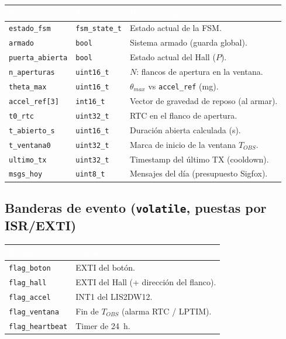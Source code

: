\documentclass[11pt,a4paper]{article}
\begin{document}
\begin{center}
\renewcommand{\arraystretch}{1.25}
\begin{tabularx}{\linewidth}{@{}l l X@{}}
\toprule
\rowcolor{Indigo0G}
\textcolor{white}{\textbf{Variable}} & \textcolor{white}{\textbf{Tipo}} & \textcolor{white}{\textbf{Descripción}} \\
\midrule
\texttt{estado\_fsm}   & \texttt{fsm\_state\_t} & Estado actual de la FSM. \\
\rowcolor{Light0G}
\texttt{armado}        & \texttt{bool}     & Sistema armado (guarda global). \\
\texttt{puerta\_abierta}& \texttt{bool}    & Estado actual del Hall ($P$). \\
\rowcolor{Light0G}
\texttt{n\_aperturas}  & \texttt{uint16\_t}& $N$: flancos de apertura en la ventana. \\
\texttt{theta\_max}    & \texttt{uint16\_t}& $\theta_{max}$ vs \texttt{accel\_ref} (mg). \\
\rowcolor{Light0G}
\texttt{accel\_ref[3]} & \texttt{int16\_t} & Vector de gravedad de reposo (al armar). \\
\texttt{t0\_rtc}       & \texttt{uint32\_t}& RTC en el flanco de apertura. \\
\rowcolor{Light0G}
\texttt{t\_abierto\_s} & \texttt{uint16\_t}& Duración abierta calculada (s). \\
\texttt{t\_ventana0}   & \texttt{uint32\_t}& Marca de inicio de la ventana $T_{OBS}$. \\
\rowcolor{Light0G}
\texttt{ultimo\_tx}    & \texttt{uint32\_t}& Timestamp del último TX (cooldown). \\
\texttt{msgs\_hoy}     & \texttt{uint8\_t} & Mensajes del día (presupuesto Sigfox). \\
\bottomrule
\end{tabularx}
\end{center}

\subsection{Banderas de evento (\texttt{volatile}, puestas por ISR/EXTI)}

\begin{center}
\renewcommand{\arraystretch}{1.2}
\begin{tabularx}{\linewidth}{@{}l X@{}}
\toprule
\rowcolor{Indigo0G}
\textcolor{white}{\textbf{Bandera}} & \textcolor{white}{\textbf{Fuente}} \\
\midrule
\texttt{flag\_boton}     & EXTI del botón. \\
\rowcolor{Light0G}
\texttt{flag\_hall}      & EXTI del Hall (+ dirección del flanco). \\
\texttt{flag\_accel}     & INT1 del LIS2DW12. \\
\rowcolor{Light0G}
\texttt{flag\_ventana}   & Fin de $T_{OBS}$ (alarma RTC / LPTIM). \\
\texttt{flag\_heartbeat} & Timer de 24~h. \\
\bottomrule
\end{tabularx}
\end{center}
\end{document}
